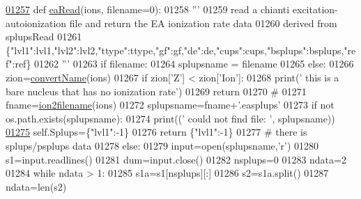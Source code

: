 \begin{DoxyCode}
\hypertarget{namespacepyneb_1_1utils_1_1__chianti__tools_l01257}{}\hyperlink{namespacepyneb_1_1utils_1_1__chianti__tools_ab4f78a2584a1ddf189af644e961f0f83}{01257} \textcolor{keyword}{def }\hyperlink{namespacepyneb_1_1utils_1_1__chianti__tools_ab4f78a2584a1ddf189af644e961f0f83}{eaRead}(ions, filename=0):
01258     \textcolor{stringliteral}{'''}
01259 \textcolor{stringliteral}{    read a chianti excitation-autoionization file and return the EA ionization rate data}
01260 \textcolor{stringliteral}{    derived from splupsRead}
01261 \textcolor{stringliteral}{    \{"lvl1":lvl1,"lvl2":lvl2,"ttype":ttype,"gf":gf,"de":de,"cups":cups,"bsplups":bsplups,"ref":ref\}}
01262 \textcolor{stringliteral}{    '''}
01263     \textcolor{keywordflow}{if} filename:
01264         splupsname = filename
01265     \textcolor{keywordflow}{else}:
01266         zion=\hyperlink{namespacepyneb_1_1utils_1_1__chianti__tools_a92cf299ad3407ee8923739e2761ab13f}{convertName}(ions)
01267         \textcolor{keywordflow}{if} zion[\textcolor{stringliteral}{'Z'}] < zion[\textcolor{stringliteral}{'Ion'}]:
01268             print(\textcolor{stringliteral}{' this is a bare nucleus that has no ionization rate'})
01269             \textcolor{keywordflow}{return}
01270         \textcolor{comment}{#}
01271         fname=\hyperlink{namespacepyneb_1_1utils_1_1__chianti__tools_ad4bc7b577fd4c3819ceb00b0a444351b}{ion2filename}(ions)
01272         splupsname=fname+\textcolor{stringliteral}{'.easplups'}
01273     \textcolor{keywordflow}{if} \textcolor{keywordflow}{not} os.path.exists(splupsname):
01274         print((\textcolor{stringliteral}{' could not find file:  '}, splupsname))
\hypertarget{namespacepyneb_1_1utils_1_1__chianti__tools_l01275}{}\hyperlink{namespacepyneb_1_1utils_1_1__chianti__tools_ae4b82a587c953b2207888a96d3364677}{01275}         self.Splups=\{\textcolor{stringliteral}{"lvl1"}:-1\}
01276         \textcolor{keywordflow}{return} \{\textcolor{stringliteral}{"lvl1"}:-1\}
01277     \textcolor{comment}{# there is splups/psplups data}
01278     \textcolor{keywordflow}{else}:
01279         input=open(splupsname,\textcolor{stringliteral}{'}\textcolor{stringliteral}{r')}
01280 \textcolor{stringliteral}{        s1=input.readlines()}
01281 \textcolor{stringliteral}{        dum=input.close()}
01282 \textcolor{stringliteral}{        nsplups=0}
01283 \textcolor{stringliteral}{        ndata=2}
01284 \textcolor{stringliteral}{        }\textcolor{keywordflow}{while} ndata > 1:
01285             s1a=s1[nsplups][:]
01286             s2=s1a.split()
01287             ndata=len(s2)

\end{DoxyCode}
